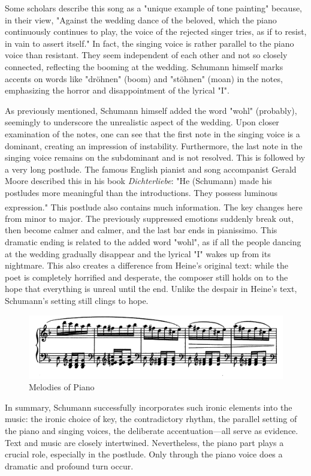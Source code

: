 \documentclass[10pt,a4paper,twocolumn]{rho}
\begin{document}
Some scholars describe this song as a "unique example of tone painting" because, in their view, "Against the wedding dance of the beloved, which the piano continuously continues to play, the voice of the rejected singer tries, as if to resist, in vain to assert itself." In fact, the singing voice is rather parallel to the piano voice than resistant. They seem independent of each other and not so closely connected, reflecting the booming at the wedding. Schumann himself marks accents on words like "dröhnen" (boom) and "stöhnen" (moan) in the notes, emphasizing the horror and disappointment of the lyrical "I".

As previously mentioned, Schumann himself added the word "wohl" (probably), seemingly to underscore the unrealistic aspect of the wedding. Upon closer examination of the notes, one can see that the first note in the singing voice is a dominant, creating an impression of instability. Furthermore, the last note in the singing voice remains on the subdominant and is not resolved. This is followed by a very long postlude. The famous English pianist and song accompanist Gerald Moore described this in his book \textit{Dichterliebe}: "He (Schumann) made his postludes more meaningful than the introductions. They possess luminous expression." This postlude also contains much information.\textsuperscript{\cite{ref2}} The key changes here from minor to major. The previously suppressed emotions suddenly break out, then become calmer and calmer, and the last bar ends in pianissimo. This dramatic ending is related to the added word "wohl", as if all the people dancing at the wedding gradually disappear and the lyrical "I" wakes up from its nightmare. This also creates a difference from Heine's original text: while the poet is completely horrified and desperate, the composer still holds on to the hope that everything is unreal until the end. Unlike the despair in Heine's text, Schumann's setting still clings to hope.
\begin{figure}[H]
    \centering
    \includegraphics[width=0.7\linewidth]{piano melody.png}
    \caption{Melodies of Piano}
    \label{fig:}
\end{figure}
In summary, Schumann successfully incorporates such ironic elements into the music: the ironic choice of key, the contradictory rhythm, the parallel setting of the piano and singing voices, the deliberate accentuation—all serve as evidence. Text and music are closely intertwined. Nevertheless, the piano part plays a crucial role, especially in the postlude. Only through the piano voice does a dramatic and profound turn occur.
\end{document}
